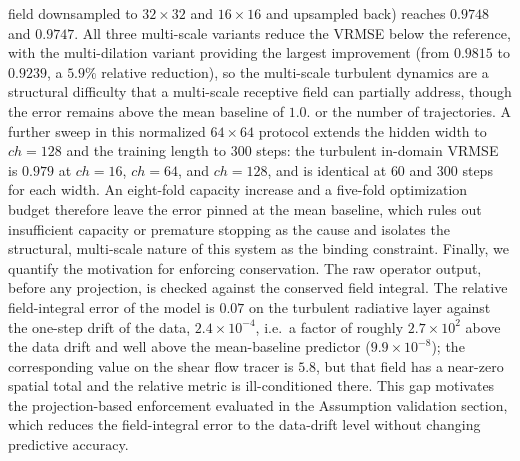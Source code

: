 \documentclass[preprint,12pt]{elsarticle}
\begin{document}
field downsampled to $32\times32$ and $16\times16$ and upsampled back) reaches $0.9748$ and $0.9747$. All three multi-scale variants reduce the VRMSE below the reference, with the multi-dilation variant providing the largest improvement (from $0.9815$ to $0.9239$, a $5.9\%$ relative reduction), so the multi-scale turbulent dynamics are a structural difficulty that a multi-scale receptive field can partially address, though the error remains above the mean baseline of $1.0$. or the number of trajectories. A further sweep in this normalized $64\times64$ protocol extends the hidden width to $ch=128$ and the training length to $300$ steps: the turbulent in-domain VRMSE is $0.979$ at $ch=16$, $ch=64$, and $ch=128$, and is identical at $60$ and $300$ steps for each width. An eight-fold capacity increase and a five-fold optimization budget therefore leave the error pinned at the mean baseline, which rules out insufficient capacity or premature stopping as the cause and isolates the structural, multi-scale nature of this system as the binding constraint. Finally, we quantify the motivation for enforcing conservation. The raw operator output, before any projection, is checked against the conserved field integral. The relative field-integral error of the model is $0.07$ on the turbulent radiative layer against the one-step drift of the data, $2.4\times10^{-4}$, i.e.\ a factor of roughly $2.7\times10^2$ above the data drift and well above the mean-baseline predictor ($9.9\times10^{-8}$); the corresponding value on the shear flow tracer is $5.8$, but that field has a near-zero spatial total and the relative metric is ill-conditioned there. This gap motivates the projection-based enforcement evaluated in the Assumption validation section, which reduces the field-integral error to the data-drift level without changing predictive accuracy.
\end{document}
